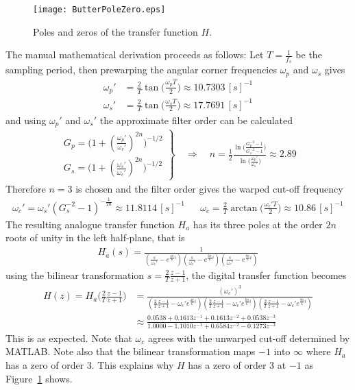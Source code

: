 \begin{figure}
\center
\texttt{[image: ButterPoleZero.eps]}
\caption{Poles and zeros of the transfer function $H$.}
\label{fig:ButterPoleZero}
\end{figure}

\noindent The manual mathematical derivation proceeds as follows: Let $T = \frac{1}{f_s}$ be the sampling period, then prewarping the angular corner frequencies $\omega_p$ and $\omega_s$ gives
\begin{align*}
\omega_p' &= \frac{2}{T} \tan\Big(\frac{\omega_p T}{2}\Big) \approx 10.7303 \, [s]^{-1} \\
\omega_s' &= \frac{2}{T} \tan\Big(\frac{\omega_s T}{2}\Big) \approx 17.7691 \, [s]^{-1} 
\end{align*}
and using $\omega_p'$ and $\omega_s'$ the approximate filter order can be calculated
\begin{align*}
\left.
\begin{array}{ll}
G_p = \big(1+(\frac{\omega_p'}{\omega_c'})^{2n}\big)^{-1/2} \\
G_s = \big(1+(\frac{\omega_s'}{\omega_c'})^{2n}\big)^{-1/2}
\end{array}
\right\} 
\quad
\Rightarrow
\quad
n = \frac{1}{2}\frac{\ln\big(\frac{G^{-2}_p-1}{G^{-2}_s-1}\big)}{\ln\big(\frac{\omega_p'}{\omega_s'}\big)}
\approx
2.89
\end{align*}
Therefore $n=3$ is chosen and the filter order gives the warped cut-off frequency
\begin{align*}
\omega_c' = \omega_s' (G_s^{-2}-1)^{-\frac{1}{2n}} \approx 11.8114 \, [s]^{-1} && \omega_c = \frac{2}{T} \arctan \Big(\frac{\omega_c' T}{2}\Big) \approx 10.86 \, [s]^{-1} 
\end{align*}
The resulting analogue transfer function $H_a$ has its three poles at the order $2n$ roots of unity in the left half-plane, that is
\begin{align*}
H_a(s) = \frac{1}{(\frac{s}{\omega_c'}-e^{\frac{4\pi}{6}i})(\frac{s}{\omega_c'}-e^{\frac{6\pi}{6}i})(\frac{s}{\omega_c'}-e^{\frac{8\pi}{6}i})}
\end{align*}
using the bilinear transformation $s = \frac{2}{T} \frac{z-1}{z+1} $, the digital transfer function becomes
\begin{align*}
H(z) = H_a\Big( \frac{2}{T} \frac{z-1}{z+1} \Big) &= \frac{(\omega_c')^3}{(\frac{2}{T} \frac{z-1}{z+1} - \omega_c' e^{\frac{4\pi}{6}i})(\frac{2}{T} \frac{z-1}{z+1} - \omega_c' e^{\frac{6\pi}{6}i})(\frac{2}{T} \frac{z-1}{z+1} - \omega_c' e^{\frac{8\pi}{6}i})} \\
&\approx \frac{0.0538 + 0.1613 z^{-1} + 0.1613 z^{-2} +	0.0538 z^{-3}}{1.0000 - 1.1010z^{-1} +0.6584z^{-2} -0.1273z^{-3}}
\end{align*}
This is as expected. Note that $\omega_c$ agrees with the unwarped cut-off determined by MATLAB.
Note also that the bilinear transformation maps $-1$ into $\infty$ where $H_a$ has a zero of order 3. This explains why $H$ has a zero of order $3$ at $-1$ as Figure~\ref{fig:ButterPoleZero} shows.


